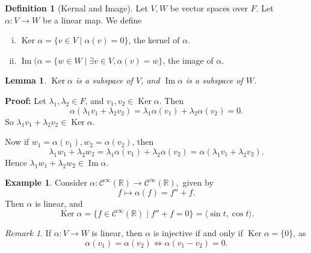 \documentclass[12pt]{article}
\DeclareMathOperator{\Ker}{Ker}
\DeclareMathOperator{\Img}{Im}
\newtheorem{lemma}{Lemma}[section]
\theoremstyle{definition}
\newtheorem{definition}{Definition}[section]
\newtheorem{example}{Example}[section]
\theoremstyle{remark}
\newtheorem*{remark}{Remark}
\begin{document}
\begin{definition}[Kernal and Image]
	Let $V, W$ be vector spaces over $F$. Let $\alpha : V \to W$ be a linear map. We define
	\begin{enumerate}[(i)]
	\item $\Ker \alpha = \{v \in V \mid \alpha(v) = 0\}$, the kernel of $\alpha$.
	\item  $\Img(\alpha = \{w \in W \mid \exists v \in V, \alpha(v) = w\}$, the image of $\alpha$.
	\end{enumerate}
\end{definition}

\begin{lemma}
	$\Ker \alpha$ is a subspace of $V$, and $\Img \alpha$ is a subspace of $W$.
\end{lemma}

\begin{adjustbox}{minipage = \columnwidth - 25.5pt, margin=1em, frame=1pt, margin=0em}
\textbf{Proof:} Let $\lambda_1, \lambda_2 \in F$, and $v_1, v_2 \in \Ker \alpha$. Then
\[
	\alpha (\lambda_1 v_1 + \lambda_2 v_2) = \lambda_1 \alpha(v_1) + \lambda_2 \alpha(v_2) = 0
.\]
So $\lambda_1 v_1 + \lambda_2 v_2 \in \Ker \alpha$.

Now if $w_1 = \alpha(v_1), w_2 = \alpha (v_2)$, then
 \[
	 \lambda_1 w_1 + \lambda_2 w_2 = \lambda_1 \alpha(v_1) + \lambda_2 \alpha(v_2) = \alpha(\lambda_1 v_1 + \lambda_2 v_2)
.\]
Hence $\lambda_1 w_1 + \lambda_2 w_2 \in \Img \alpha$.
\end{adjustbox}

\begin{adjustbox}{minipage = \columnwidth - 25.5pt, margin=1em, frame=1pt, margin=0em}
\begin{example}
	Consider $\alpha : \mathcal{C}^{\infty}(\mathbb{R}) \to \mathcal{C}^{\infty}(\mathbb{R}),$ given by
	\[
		f \mapsto \alpha(f) = f'' + f
	.\]
	Then $\alpha$ is linear, and
	\[
		\Ker \alpha = \{f \in \mathcal{C}^{\infty}(\mathbb{R}) \mid f'' + f = 0\} = \langle \sin t, \cos t \rangle
	.\]
\end{example}

\end{adjustbox}

\begin{remark}
	If $\alpha : V \to W$ is linear, then $\alpha$ is injective if and only if $\Ker \alpha = \{0\}$, as
	\[
		\alpha(v_1) = \alpha(v_2) \iff \alpha(v_1 - v_2) = 0
	.\]
\end{remark}
\end{document}
